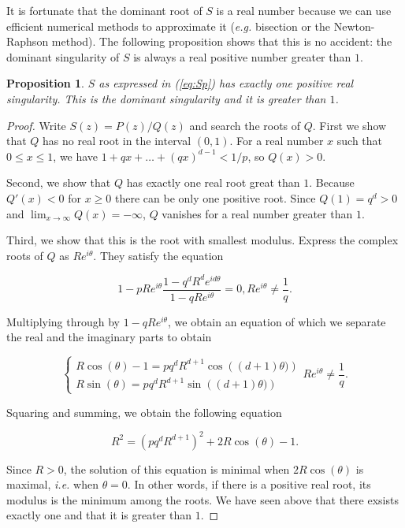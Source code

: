 \documentclass{article}
\newtheorem{proposition}{Proposition}
\begin{document}
It is fortunate that the dominant root of $S$ is a real number because we
can use efficient numerical methods to approximate it (\textit{e.g.}
bisection or the Newton-Raphson method). The following proposition shows
that this is no accident: the dominant singularity of $S$ is always a real
positive number greater than $1$.

\begin{proposition}
\label{th:roots}
$S$ as expressed in (\ref{eq:Sp}) has exactly one positive real
singularity. This is the dominant singularity and it is greater than $1$.
\end{proposition}

\begin{proof}
Write $S(z) = P(z)/Q(z)$ and search the roots of $Q$. First we show that
$Q$ has no real root in the interval $(0,1)$. For a real number $x$ such
that $0\leq x \leq 1$, we have $1+qx+\ldots+(qx)^{d-1} < 1/p$, so $Q(x) >
0$.

Second, we show that $Q$ has exactly one real root great than $1$. Because
$Q'(x) < 0$ for $x \geq 0$ there can be only one positive root.  Since
$Q(1) = q^d > 0$ and $\lim_{x\rightarrow \infty} Q(x) = -\infty$, $Q$
vanishes for a real number greater than $1$.

Third, we show that this is the root with smallest modulus.  Express the
complex roots of $Q$ as $Re^{i\theta}$. They satisfy the equation

\begin{equation*}
1-pRe^{i\theta}\frac{1-q^dR^de^{id\theta}}{1-qRe^{i\theta}} = 0,
Re^{i\theta} \neq \frac{1}{q}.
\end{equation*}

Multiplying through by $1-qRe^{i\theta}$, we obtain an equation of which
we separate the real and the imaginary parts to obtain

\begin{equation*}
\left\{
\begin{array}{ll}
R \cos (\theta) -1 = pq^dR^{d+1} \cos \left( (d+1) \theta) \right) \\
R \sin (\theta) = pq^dR^{d+1} \sin \left( (d+1) \theta) \right)
\end{array}
\right. Re^{i\theta} \neq \frac{1}{q}.
\end{equation*}

Squaring and summing, we obtain the following equation

\begin{equation*}
R^2 = (pq^dR^{d+1})^2 + 2R \cos(\theta) -1.
\end{equation*}

Since $R > 0$, the solution of this equation is minimal when
$2R\cos(\theta)$ is maximal, \textit{i.e.} when $\theta = 0$. In other
words, if there is a positive real root, its modulus is the minimum among
the roots. We have seen above that there exsists exactly one and that it
is greater than $1$.
\end{proof}
\end{document}
